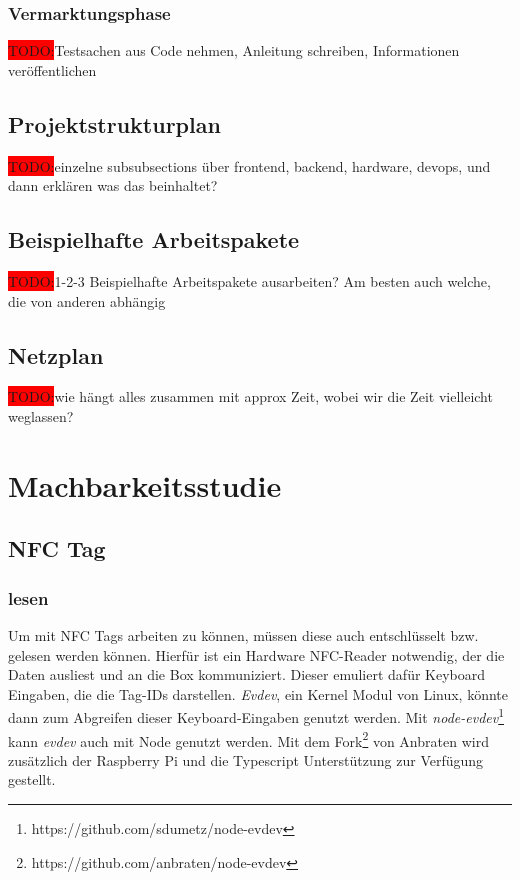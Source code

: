 \documentclass[10pt, a4paper, draft]{article}
\begin{document}
\subsubsection{Vermarktungsphase}
\colorbox{red}{TODO:}Testsachen aus Code nehmen, Anleitung schreiben, Informationen veröffentlichen

\subsection{Projektstrukturplan}
\colorbox{red}{TODO:}einzelne subsubsections über frontend, backend, hardware, devops, und dann erklären was das beinhaltet?

\subsection{Beispielhafte Arbeitspakete}
\colorbox{red}{TODO:}1-2-3 Beispielhafte Arbeitspakete ausarbeiten? Am besten auch welche, die von anderen abhängig

\subsection{Netzplan}
\colorbox{red}{TODO:}wie hängt alles zusammen mit approx Zeit, wobei wir die Zeit vielleicht weglassen?

\section{Machbarkeitsstudie}

\subsection{NFC Tag}
\subsubsection{lesen}
Um mit NFC Tags arbeiten zu können, müssen diese auch entschlüsselt bzw. gelesen werden können.
Hierfür ist ein Hardware NFC-Reader notwendig, der die Daten ausliest und an die Box kommuniziert.
Dieser emuliert dafür Keyboard Eingaben, die die Tag-IDs darstellen.
\textit{Evdev}, ein Kernel Modul von Linux, könnte dann zum Abgreifen dieser Keyboard-Eingaben genutzt werden. Mit \textit{node-evdev}\footnote{https://github.com/sdumetz/node-evdev} kann \textit{evdev} auch mit Node genutzt werden. Mit dem Fork\footnote{https://github.com/anbraten/node-evdev} von Anbraten wird zusätzlich der Raspberry Pi und die Typescript Unterstützung zur Verfügung gestellt.
\end{document}
